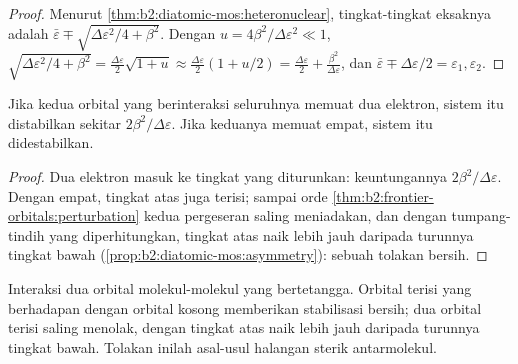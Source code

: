 \begin{proof}
Menurut \cref{thm:b2:diatomic-mos:heteronuclear}, tingkat-tingkat eksaknya adalah $\bar\varepsilon \mp
\sqrt{\Delta\varepsilon^2/4 + \beta^2}$. Dengan $u = 4\beta^2/\Delta\varepsilon^2 \ll 1$, $\sqrt{\Delta\varepsilon^2/4
+ \beta^2} = \frac{\Delta\varepsilon}{2}\sqrt{1 + u} \approx \frac{\Delta\varepsilon}{2}(1 + u/2) =
\frac{\Delta\varepsilon}{2} + \frac{\beta^2}{\Delta\varepsilon}$, dan $\bar\varepsilon \mp \Delta\varepsilon/2 = \varepsilon_1,
\varepsilon_2$.
\end{proof}

\begin{proposition}\label{prop:b2:frontier-orbitals:four-electron}
Jika kedua orbital yang berinteraksi seluruhnya memuat dua elektron, sistem
itu distabilkan sekitar $2\beta^2/\Delta\varepsilon$. Jika keduanya memuat
empat, sistem itu didestabilkan.
\end{proposition}

\begin{proof}
Dua elektron masuk ke tingkat yang diturunkan: keuntungannya
$2\beta^2/\Delta\varepsilon$. Dengan empat, tingkat atas juga terisi; sampai
orde \cref{thm:b2:frontier-orbitals:perturbation} kedua pergeseran saling
meniadakan, dan dengan tumpang-tindih yang diperhitungkan, tingkat atas
naik lebih jauh daripada turunnya tingkat bawah
(\cref{prop:b2:diatomic-mos:asymmetry}): sebuah tolakan bersih.
\end{proof}

\begin{omfigure}

{\small Interaksi dua orbital molekul-molekul yang bertetangga. Orbital
terisi yang berhadapan dengan orbital kosong memberikan stabilisasi
bersih; dua orbital terisi saling menolak, dengan tingkat atas naik lebih
jauh daripada turunnya tingkat bawah. Tolakan inilah asal-usul halangan
sterik antarmolekul.}
\end{omfigure}

